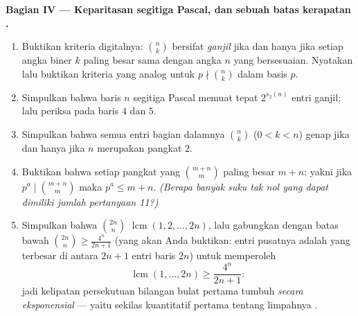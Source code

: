 \begin{problem}
\medskip
\noindent\textbf{Bagian IV --- Keparitasan segitiga Pascal, dan
sebuah batas kerapatan .}
\begin{enumerate}[resume]
  \item Buktikan kriteria digitalnya: $\binom nk$ bersifat \emph{ganjil} jika
        dan hanya jika setiap angka biner $k$ paling besar sama dengan
        angka $n$ yang bersesuaian. Nyatakan lalu buktikan kriteria yang analog
        untuk $p \nmid \binom nk$ dalam basis $p$.
  \item Simpulkan bahwa baris $n$ segitiga Pascal memuat tepat
        $2^{s_2(n)}$ entri ganjil; lalu periksa pada baris $4$ dan $5$.
  \item Simpulkan bahwa semua entri bagian dalamnya $\binom nk$ ($0 < k < n$)
        genap jika dan hanya jika $n$ merupakan pangkat $2$.
  \item Buktikan bahwa setiap pangkat  yang  $\binom{m+n}m$ paling
        besar $m + n$: yakni jika $p^a \mid \binom{m+n}m$ maka $p^a \leq
        m + n$. \emph{(Berapa banyak suku tak nol yang dapat dimiliki jumlah
        pertanyaan 11?)}
  \item Simpulkan bahwa $\binom{2n}n$ 
        $\operatorname{lcm}(1, 2, \dots, 2n)$, lalu gabungkan dengan
        batas bawah $\binom{2n}n \geq \frac{4^n}{2n+1}$
        (yang akan Anda buktikan: entri pusatnya adalah yang terbesar
        di antara $2n + 1$ entri baris $2n$) untuk memperoleh
        \[
        \operatorname{lcm}(1, \dots, 2n) \geq \frac{4^n}{2n+1} :
        \]
        jadi kelipatan persekutuan bilangan bulat pertama tumbuh
        \emph{secara eksponensial} --- yaitu sekilas kuantitatif pertama tentang
        limpahnya .
\end{enumerate}


\end{problem}
